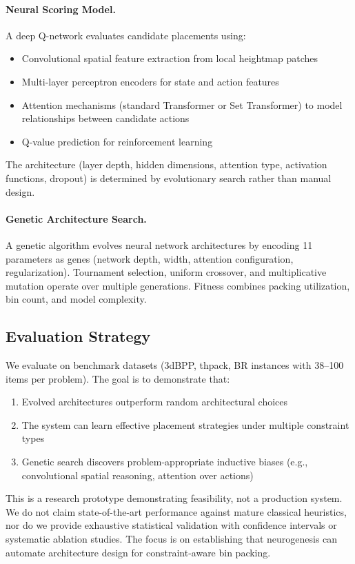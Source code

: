 \paragraph{Neural Scoring Model.}
A deep Q-network evaluates candidate placements using:
\begin{itemize}
    \item Convolutional spatial feature extraction from local heightmap patches
    \item Multi-layer perceptron encoders for state and action features
    \item Attention mechanisms (standard Transformer or Set Transformer) to model relationships between candidate actions
    \item Q-value prediction for reinforcement learning
\end{itemize}

The architecture (layer depth, hidden dimensions, attention type, activation functions, dropout) is determined by evolutionary search rather than manual design.

\paragraph{Genetic Architecture Search.}
A genetic algorithm evolves neural network architectures by encoding 11 parameters as genes (network depth, width, attention configuration, regularization). Tournament selection, uniform crossover, and multiplicative mutation operate over multiple generations. Fitness combines packing utilization, bin count, and model complexity.

\subsection{Evaluation Strategy}

We evaluate on benchmark datasets (3dBPP, thpack, BR instances with 38--100 items per problem). The goal is to demonstrate that:
\begin{enumerate}
    \item Evolved architectures outperform random architectural choices
    \item The system can learn effective placement strategies under multiple constraint types
    \item Genetic search discovers problem-appropriate inductive biases (e.g., convolutional spatial reasoning, attention over actions)
\end{enumerate}

This is a research prototype demonstrating feasibility, not a production system. We do not claim state-of-the-art performance against mature classical heuristics, nor do we provide exhaustive statistical validation with confidence intervals or systematic ablation studies. The focus is on establishing that neurogenesis can automate architecture design for constraint-aware bin packing.
